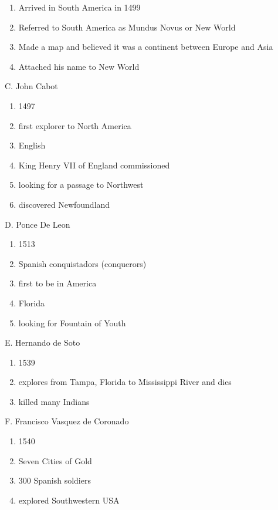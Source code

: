 \documentclass{article}
\begin{document}
\begin{enumerate}
    \item Arrived in South America in 1499
    \item Referred to South America as Mundus Novus or New World
    \item Made a map and believed it was a continent between Europe and Asia
    \item Attached his name to New World
\end{enumerate}

\noindent C. John Cabot

\begin{enumerate}
    \item 1497
    \item first explorer to North America
    \item English
    \item King Henry VII of England commissioned
    \item looking for a passage to Northwest
    \item discovered Newfoundland
\end{enumerate}

\noindent D. Ponce De Leon

\begin{enumerate}
    \item 1513
    \item Spanish conquistadors (conquerors)
    \item first to be in America
    \item Florida
    \item looking for Fountain of Youth
\end{enumerate}

\noindent E. Hernando de Soto

\begin{enumerate}
    \item 1539
    \item explores from Tampa, Florida to Mississippi River and dies
    \item killed many Indians
\end{enumerate}

\noindent F. Francisco Vasquez de Coronado

\begin{enumerate}
    \item 1540
    \item Seven Cities of Gold
    \item 300 Spanish soldiers
    \item explored Southwestern USA
\end{enumerate}
\end{document}
